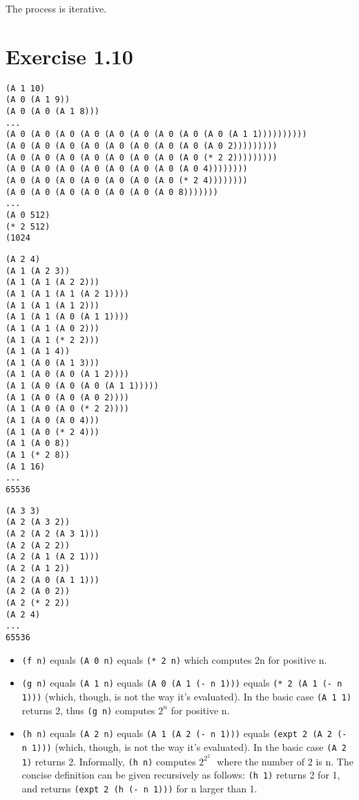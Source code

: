 \documentclass[../main.tex]{subfiles}
\begin{document}
The process is iterative.

\section{Exercise 1.10}

\begin{lstlisting}
(A 1 10)
(A 0 (A 1 9))
(A 0 (A 0 (A 1 8)))
...
(A 0 (A 0 (A 0 (A 0 (A 0 (A 0 (A 0 (A 0 (A 0 (A 1 1))))))))))
(A 0 (A 0 (A 0 (A 0 (A 0 (A 0 (A 0 (A 0 (A 0 2)))))))))
(A 0 (A 0 (A 0 (A 0 (A 0 (A 0 (A 0 (A 0 (* 2 2)))))))))
(A 0 (A 0 (A 0 (A 0 (A 0 (A 0 (A 0 (A 0 4))))))))
(A 0 (A 0 (A 0 (A 0 (A 0 (A 0 (A 0 (* 2 4))))))))
(A 0 (A 0 (A 0 (A 0 (A 0 (A 0 (A 0 8)))))))
...
(A 0 512)
(* 2 512)
(1024
\end{lstlisting}

\begin{lstlisting}
(A 2 4)
(A 1 (A 2 3))
(A 1 (A 1 (A 2 2)))
(A 1 (A 1 (A 1 (A 2 1))))
(A 1 (A 1 (A 1 2)))
(A 1 (A 1 (A 0 (A 1 1))))
(A 1 (A 1 (A 0 2)))
(A 1 (A 1 (* 2 2)))
(A 1 (A 1 4))
(A 1 (A 0 (A 1 3)))
(A 1 (A 0 (A 0 (A 1 2))))
(A 1 (A 0 (A 0 (A 0 (A 1 1)))))
(A 1 (A 0 (A 0 (A 0 2))))
(A 1 (A 0 (A 0 (* 2 2))))
(A 1 (A 0 (A 0 4)))
(A 1 (A 0 (* 2 4)))
(A 1 (A 0 8))
(A 1 (* 2 8))
(A 1 16)
...
65536
\end{lstlisting}

\begin{lstlisting}
(A 3 3)
(A 2 (A 3 2))
(A 2 (A 2 (A 3 1)))
(A 2 (A 2 2))
(A 2 (A 1 (A 2 1)))
(A 2 (A 1 2))
(A 2 (A 0 (A 1 1)))
(A 2 (A 0 2))
(A 2 (* 2 2))
(A 2 4)
...
65536
\end{lstlisting}

\begin{itemize}
\item \lstinline{(f n)} equals \lstinline{(A 0 n)} equals \lstinline{(* 2 n)} which computes 2n for positive n.
\item \lstinline{(g n)} equals \lstinline{(A 1 n)} equals \lstinline{(A 0 (A 1 (- n 1)))} equals \lstinline{(* 2 (A 1 (- n 1)))} (which, though, is not the way it's evaluated). In the basic case \lstinline{(A 1 1)} returns 2, thus \lstinline{(g n)} computes $2^n$ for positive n.
\item \lstinline{(h n)} equals \lstinline{(A 2 n)} equals \lstinline{(A 1 (A 2 (- n 1)))} equals \lstinline{(expt 2 (A 2 (- n 1)))} (which, though, is not the way it's evaluated). In the basic case \lstinline{(A 2 1)} returns 2. Informally, \lstinline{(h n)} computes $2^{2^{2^{...}}}$ where the number of 2 is n. The concise definition can be given recursively as follows: \lstinline{(h 1)} returns 2 for 1, and returns \lstinline{(expt 2 (h (- n 1)))} for n larger than 1.
\end{itemize}
\end{document}
